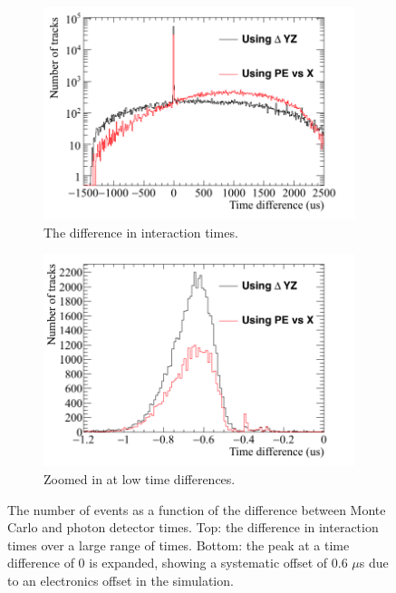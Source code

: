 \begin{figure}
  \centering
  \begin{subfigure}{0.6\textwidth}
    \centering
    \includegraphics[width=\textwidth]{Pred_Reco_T_Full}
    \caption{The difference in interaction times.}
    \label{fig:PD_MCPDDiff_All}
  \end{subfigure}
  \begin{subfigure}{0.6\textwidth}
    \centering
    \includegraphics[width=\textwidth]{Pred_Reco_T_Zoom}
    \caption{Zoomed in at low time differences.}
    \label{fig:PD_MCPDDiff_Zoom}
  \end{subfigure}
  \caption[The number of events as a function of the difference between Monte Carlo and photon detector times]
          {The number of events as a function of the difference between Monte Carlo and photon detector times. Top: the difference in interaction times over a large range of times. Bottom: the peak at a time difference of 0 is expanded, showing a systematic offset of 0.6 $\mu$s due to an electronics offset in the simulation.}
          \label{fig:PD_MCPDDiff}
\end{figure}

